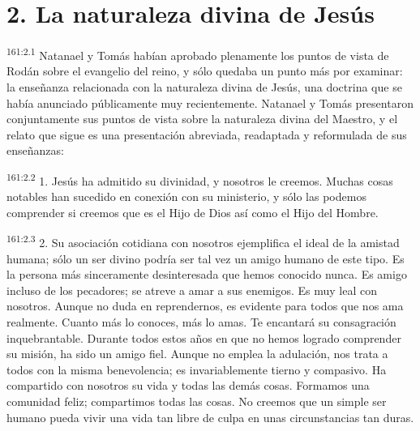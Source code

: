 \section*{2. La naturaleza divina de Jesús}
\par
\textsuperscript{161:2.1} Natanael y Tomás habían aprobado plenamente los puntos de vista de Rodán sobre el evangelio del reino, y sólo quedaba un punto más por examinar: la enseñanza relacionada con la naturaleza divina de Jesús, una doctrina que se había anunciado públicamente muy recientemente. Natanael y Tomás presentaron conjuntamente sus puntos de vista sobre la naturaleza divina del Maestro, y el relato que sigue es una presentación abreviada, readaptada y reformulada de sus enseñanzas:

\par
\textsuperscript{161:2.2} 1. Jesús ha admitido su divinidad, y nosotros le creemos. Muchas cosas notables han sucedido en conexión con su ministerio, y sólo las podemos comprender si creemos que es el Hijo de Dios así como el Hijo del Hombre.

\par
\textsuperscript{161:2.3} 2. Su asociación cotidiana con nosotros ejemplifica el ideal de la amistad humana; sólo un ser divino podría ser tal vez un amigo humano de este tipo. Es la persona más sinceramente desinteresada que hemos conocido nunca. Es amigo incluso de los pecadores; se atreve a amar a sus enemigos. Es muy leal con nosotros. Aunque no duda en reprendernos, es evidente para todos que nos ama realmente. Cuanto más lo conoces, más lo amas. Te encantará su consagración inquebrantable. Durante todos estos años en que no hemos logrado comprender su misión, ha sido un amigo fiel. Aunque no emplea la adulación, nos trata a todos con la misma benevolencia; es invariablemente tierno y compasivo. Ha compartido con nosotros su vida y todas las demás cosas. Formamos una comunidad feliz; compartimos todas las cosas. No creemos que un simple ser humano pueda vivir una vida tan libre de culpa en unas circunstancias tan duras.

